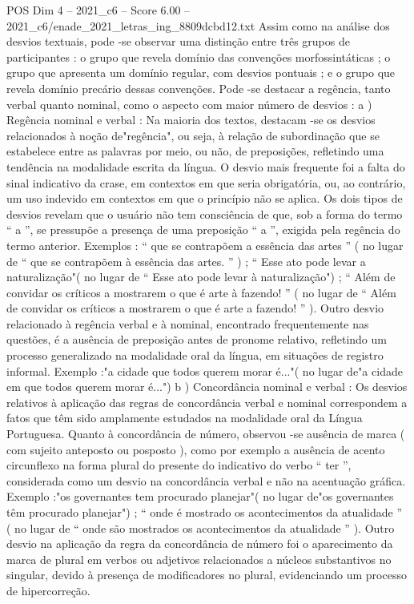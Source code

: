 \begin{textsample}{POS Dim 4 – 2021\_c6 – Score 6.00 – 2021\_c6/enade\_2021\_letras\_ing\_8809dcbd12.txt}
Assim como na análise dos desvios textuais, pode -se observar uma distinção entre três grupos de participantes : o grupo que revela domínio das convenções morfossintáticas ; o grupo que apresenta um domínio regular, com desvios pontuais ; e o grupo que revela domínio precário dessas convenções.
Pode -se destacar a regência, tanto verbal quanto nominal, como o aspecto com maior número de desvios : a ) Regência nominal e verbal : Na maioria dos textos, destacam -se os desvios relacionados à noção de"regência", ou seja, à relação de subordinação que se estabelece entre as palavras por meio, ou não, de preposições, refletindo uma tendência na modalidade escrita da língua.
O desvio mais frequente foi a falta do sinal indicativo da crase, em contextos em que seria obrigatória, ou, ao contrário, um uso indevido em contextos em que o princípio não se aplica.
Os dois tipos de desvios revelam que o usuário não tem consciência de que, sob a forma do termo “ a ”, se pressupõe a presença de uma preposição “ a ”, exigida pela regência do termo anterior.
Exemplos : “ que se contrapõem a essência das artes ” ( no lugar de “ que se contrapõem à essência das artes. ” ) ; “ Esse ato pode levar a naturalização"( no lugar de “ Esse ato pode levar à naturalização") ; “ Além de convidar os críticos a mostrarem o que é arte à fazendo! ” ( no lugar de “ Além de convidar os críticos a mostrarem o que é arte a fazendo! ” ).
Outro desvio relacionado à regência verbal e à nominal, encontrado frequentemente nas questões, é a ausência de preposição antes de pronome relativo, refletindo um processo generalizado na modalidade oral da língua, em situações de registro informal.
Exemplo :"a cidade que todos querem morar é..."( no lugar de"a cidade em que todos querem morar é...") b ) Concordância nominal e verbal : Os desvios relativos à aplicação das regras de concordância verbal e nominal correspondem a fatos que têm sido amplamente estudados na modalidade oral da Língua Portuguesa.
Quanto à concordância de número, observou -se ausência de marca ( com sujeito anteposto ou posposto ), como por exemplo a ausência de acento circunflexo na forma plural do presente do indicativo do verbo “ ter ”, considerada como um desvio na concordância verbal e não na acentuação gráfica.
Exemplo :"os governantes tem procurado planejar"( no lugar de"os governantes têm procurado planejar") ; “ onde é mostrado os acontecimentos da atualidade ” ( no lugar de “ onde são mostrados os acontecimentos da atualidade ” ).
Outro desvio na aplicação da regra da concordância de número foi o aparecimento da marca de plural em verbos ou adjetivos relacionados a núcleos substantivos no singular, devido à presença de modificadores no plural, evidenciando um processo de hipercorreção.

\end{textsample}
